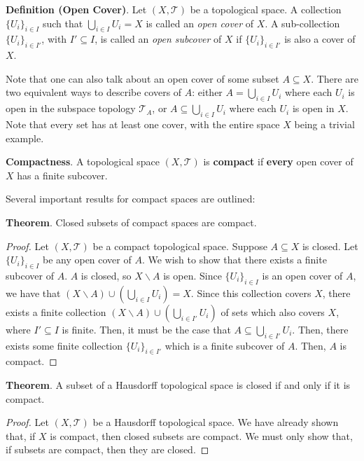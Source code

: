 \textbf{Definition (Open Cover)}. Let $(X,\mathcal{T})$ be a topological space. A collection $\{U_i\}_{i\in I}$ such that $\bigcup_{i\in I} U_i = X$ is called an \textit{open cover} of $X$. A sub-collection $\{U_i\}_{i\in I'}$, with $I'\subseteq I$, is called an \textit{open subcover} of $X$ if $\{U_i\}_{i\in I'}$ is also a cover of $X$.

Note that one can also talk about an open cover of some subset $A\subseteq X$. There are two equivalent ways to describe covers of $A$: either $A=\bigcup_{i\in I} U_i$ where each $U_i$ is open in the subspace topology $\mathcal{T}_A$, or $A\subseteq \bigcup_{i\in I} U_i$ where each $U_i$ is open in $X$. Note that every set has at least one cover, with the entire space $X$ being a trivial example.

\begin{framed}
    \textbf{Compactness}. A topological space $(X,\mathcal{T})$ is \textbf{compact} if \textbf{every} open cover of $X$ has a finite subcover.

    Several important results for compact spaces are outlined:

    \textbf{Theorem}. Closed subsets of compact spaces are compact. \vspace{-1em}\begin{proof}
        Let $(X,\mathcal{T})$ be a compact topological space. Suppose $A\subseteq X$ is closed. Let $\{U_i\}_{i\in I}$ be any open cover of $A$. We wish to show that there exists a finite subcover of $A$. $A$ is closed, so $X\backslash A$ is open. Since $\{U_i\}_{i\in I}$ is an open cover of $A$, we have that $(X\backslash A) \cup \left(\displaystyle\bigcup_{i\in I} U_i\right) = X$. Since this collection covers $X$, there exists a finite collection $(X\backslash A)\cup\left(\displaystyle\bigcup_{i\in I'} U_i\right)$ of sets which also covers $X$, where $I'\subseteq I$ is finite. Then, it must be the case that $A\subseteq \displaystyle\bigcup_{i\in I'}U_i$. Then, there exists some finite collection $\{U_i\}_{i\in I'}$ which is a finite subcover of $A$. Then, $A$ is compact.
    \end{proof}

    \textbf{Theorem}. A subset of a Hausdorff topological space is closed if and only if it is compact.

    \vspace{-1em}\begin{proof}
        Let $(X,\mathcal{T})$ be a Hausdorff topological space. We have already shown that, if $X$ is compact, then closed subsets are compact. We must only show that, if subsets are compact, then they are closed.


\end{proof}
\end{framed}
